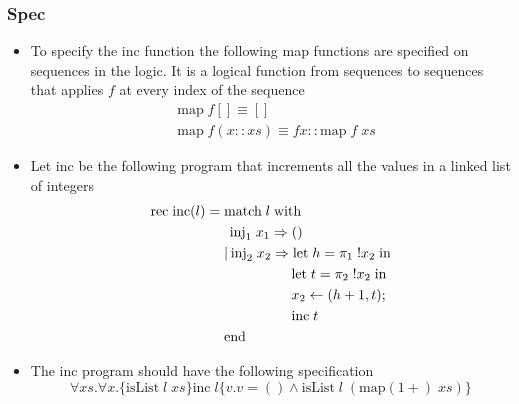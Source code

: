 \subsubsection{Spec}
\begin{itemize}
  \item To specify the inc function the following map functions are specified on sequences in the logic. It is a logical function from sequences to sequences that applies $f$ at every index of the sequence
  \begin{align*}
    &\text{map} \; f[] \equiv [] \\
    &\text{map} \; f(x :: xs) \equiv f x :: \text{map} \; f \; xs
  \end{align*}
	\item Let inc be the following program that increments all the values in a linked list of integers 
  \begin{align*}
    \text{rec} \; \text{inc}(l) = \; &\text{match} \; l \; \text{with} \\
                                     & \hspace{4px} \text{inj}_1 \; x_1 \Rightarrow () \\
                                     &| \hspace{2px}  \text{inj}_2 \; x_2 \Rightarrow \text{let} \; h= \pi_1 \; !x_2 \; \text{in} \\
                                     & \hspace{48px} \text{let} \; t = \pi_2 \; !x_2 \; \text{in} \\
                                     & \hspace{48px} x_2 \leftarrow (h+1, t); \\
                                     & \hspace{48px} \text{inc} \; t \\
                                     & \text{end}
  \end{align*}
  \item The inc program should have the following specification 
  \begin{equation*}
    \forall xs. \forall x. \{\text{isList} \; l \; xs \} \text{inc} \; l \{v.v = () \land \text{isList} \; l \; (\text{map}(1+) \; xs)\}
  \end{equation*}
\end{itemize}

